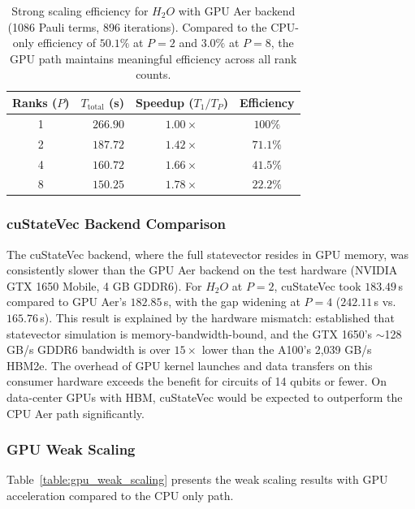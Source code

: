 \begin{table}[!ht]
\centering
\renewcommand{\arraystretch}{1.2}
\caption{Strong scaling efficiency for $H_{2}O$ with GPU Aer backend (1086 Pauli terms, 896 iterations). Compared to the CPU-only efficiency of $50.1\%$ at $P=2$ and $3.0\%$ at $P=8$, the GPU path maintains meaningful efficiency across all rank counts.}
\label{table:gpu_scaling}
\begin{tabular}{|c|r|c|c|}
\hline
\textbf{Ranks ($P$)} & \textbf{$T_{\text{total}}$ (s)} & \textbf{Speedup ($T_1/T_P$)} & \textbf{Efficiency} \\ \hline
1 & $266.90$ & $1.00\times$ & $100\%$  \\ \hline
2 & $187.72$ & $1.42\times$ & $71.1\%$ \\ \hline
4 & $160.72$ & $1.66\times$ & $41.5\%$ \\ \hline
8 & $150.25$ & $1.78\times$ & $22.2\%$ \\ \hline
\end{tabular}
\end{table}

\subsubsection{cuStateVec Backend Comparison}
The cuStateVec backend, where the full statevector resides in GPU memory, was consistently slower than the 
GPU Aer backend on the test hardware (NVIDIA GTX 1650 Mobile, 4 GB GDDR6). For $H_{2}O$ at $P=2$, cuStateVec 
took $183.49$\,s compared to GPU Aer's $182.85$\,s, with the gap widening at $P=4$ ($242.11$\,s vs. $165.76$\,s). 
This result is explained by the hardware mismatch: \textcite{bayraktar2023cuquantum} established 
that statevector simulation is memory-bandwidth-bound, and the GTX 1650's $\sim$128 GB/s GDDR6 bandwidth is 
over $15\times$ lower than the A100's 2,039 GB/s HBM2e. The overhead of GPU kernel launches and data transfers on this consumer hardware exceeds the benefit for circuits of 14 qubits or fewer. On data-center GPUs with HBM, cuStateVec would be expected to outperform the CPU Aer path significantly.

\subsubsection{GPU Weak Scaling}
Table~\ref{table:gpu_weak_scaling} presents the weak scaling results with GPU acceleration compared to the CPU only path.

